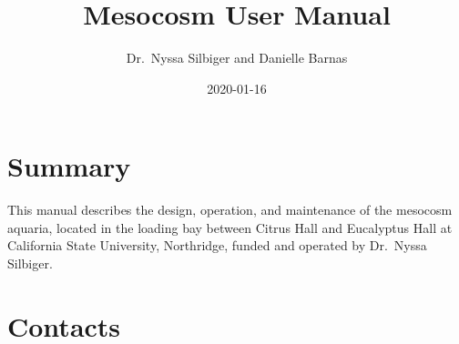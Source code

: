 \documentclass[]{book}
\title{Mesocosm User Manual}
\author{Dr.~Nyssa Silbiger and Danielle Barnas}
\date{2020-01-16}
\begin{document}
\maketitle

{
\setcounter{tocdepth}{1}
\tableofcontents
}
\chapter{Summary}\label{summary}

This manual describes the design, operation, and maintenance of the
mesocosm aquaria, located in the loading bay between Citrus Hall and
Eucalyptus Hall at California State University, Northridge, funded and
operated by Dr.~Nyssa Silbiger.

\chapter{Contacts}\label{contacts}
\end{document}

